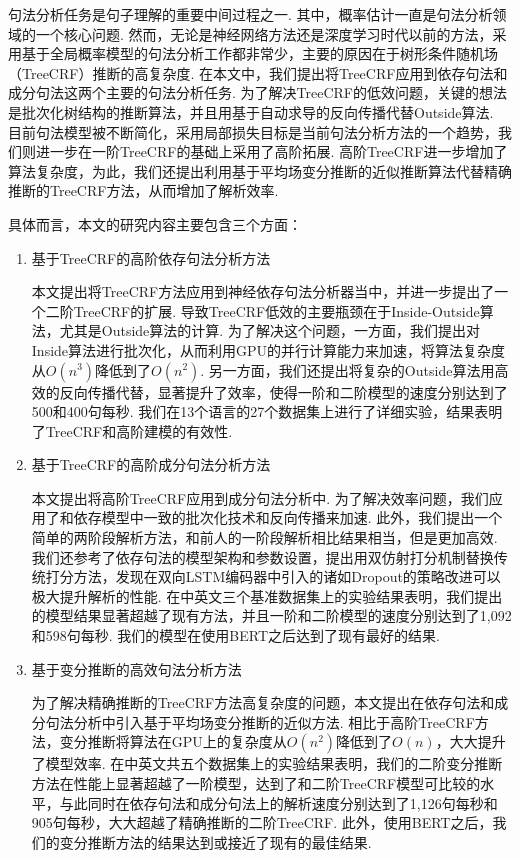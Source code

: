 
\begin{cabstract}
	句法分析任务是句子理解的重要中间过程之一.
	其中，概率估计一直是句法分析领域的一个核心问题.
	然而，无论是神经网络方法还是深度学习时代以前的方法，采用基于全局概率模型的句法分析工作都非常少，主要的原因在于树形条件随机场（TreeCRF）推断的高复杂度.
	在本文中，我们提出将TreeCRF应用到依存句法和成分句法这两个主要的句法分析任务.
	为了解决TreeCRF的低效问题，关键的想法是批次化树结构的推断算法，并且用基于自动求导的反向传播代替Outside算法.
	目前句法模型被不断简化，采用局部损失目标是当前句法分析方法的一个趋势，我们则进一步在一阶TreeCRF的基础上采用了高阶拓展.
	高阶TreeCRF进一步增加了算法复杂度，为此，我们还提出利用基于平均场变分推断的近似推断算法代替精确推断的TreeCRF方法，从而增加了解析效率.

	具体而言，本文的研究内容主要包含三个方面：
	\begin{enumerate}

		\item 基于TreeCRF的高阶依存句法分析方法

		      本文提出将TreeCRF方法应用到神经依存句法分析器当中，并进一步提出了一个二阶TreeCRF的扩展.
		      导致TreeCRF低效的主要瓶颈在于Inside-Outside算法，尤其是Outside算法的计算.
		      为了解决这个问题，一方面，我们提出对Inside算法进行批次化，从而利用GPU的并行计算能力来加速，将算法复杂度从$O(n^3)$降低到了$O(n^2)$.
		      另一方面，我们还提出将复杂的Outside算法用高效的反向传播代替，显著提升了效率，使得一阶和二阶模型的速度分别达到了500和400句每秒.
		      我们在13个语言的27个数据集上进行了详细实验，结果表明了TreeCRF和高阶建模的有效性.

		\item 基于TreeCRF的高阶成分句法分析方法

		      本文提出将高阶TreeCRF应用到成分句法分析中.
		      为了解决效率问题，我们应用了和依存模型中一致的批次化技术和反向传播来加速.
		      此外，我们提出一个简单的两阶段解析方法，和前人的一阶段解析相比结果相当，但是更加高效.
		      我们还参考了依存句法的模型架构和参数设置，提出用双仿射打分机制替换传统打分方法，发现在双向LSTM编码器中引入的诸如Dropout的策略改进可以极大提升解析的性能.
		      在中英文三个基准数据集上的实验结果表明，我们提出的模型结果显著超越了现有方法，并且一阶和二阶模型的速度分别达到了1,092和598句每秒.
		      我们的模型在使用BERT之后达到了现有最好的结果.

		\item 基于变分推断的高效句法分析方法

		      为了解决精确推断的TreeCRF方法高复杂度的问题，本文提出在依存句法和成分句法分析中引入基于平均场变分推断的近似方法.
		      相比于高阶TreeCRF方法，变分推断将算法在GPU上的复杂度从$O(n^2)$降低到了$O(n)$，大大提升了模型效率.
		      在中英文共五个数据集上的实验结果表明，我们的二阶变分推断方法在性能上显著超越了一阶模型，达到了和二阶TreeCRF模型可比较的水平，与此同时在依存句法和成分句法上的解析速度分别达到了1,126句每秒和905句每秒，大大超越了精确推断的二阶TreeCRF.
		      此外，使用BERT之后，我们的变分推断方法的结果达到或接近了现有的最佳结果.


\end{enumerate}
\end{cabstract}
